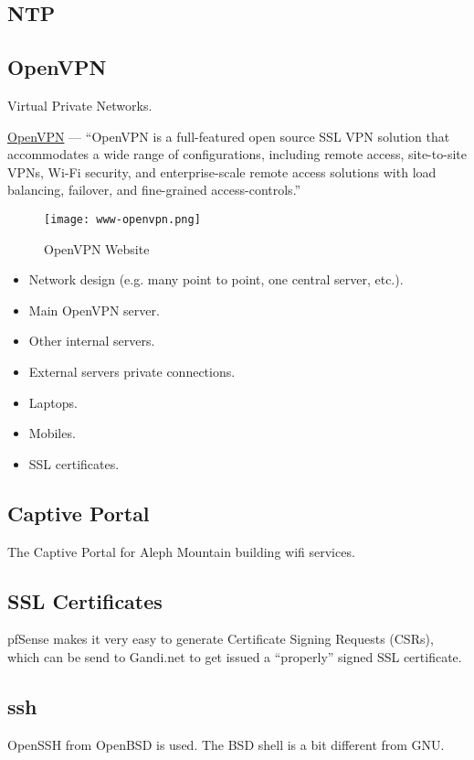\subsection{NTP}


\subsection{OpenVPN}
Virtual Private Networks.


\href{https://www.openvpn.net/}{OpenVPN} --- ``OpenVPN is a full-featured open source SSL VPN solution that accommodates a wide range of configurations, including remote access, site-to-site VPNs, Wi-Fi security, and enterprise-scale remote access solutions with load balancing, failover, and fine-grained access-controls.''

\begin{figure}[h!]
\texttt{[image: www-openvpn.png]}
 \caption{OpenVPN Website}
 \label{fig:www-openvpn}
\end{figure}


\begin{itemize}
 \item Network design (e.g. many point to point, one central server, etc.).
 \item Main OpenVPN server.
 \item Other internal servers.
 \item External servers private connections.
 \item Laptops.
 \item Mobiles.
 \item SSL certificates.
\end{itemize}


\subsection{Captive Portal}
The Captive Portal for Aleph Mountain building wifi services.


\subsection{SSL Certificates}
pfSense makes it very easy to generate Certificate Signing Requests (CSRs),
which can be send to Gandi.net to get issued a ``properly'' signed SSL
certificate.


\subsection{ssh}
OpenSSH from OpenBSD is used. The BSD shell is a bit different from GNU.


